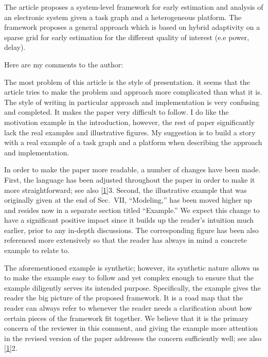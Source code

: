 \begin{reviewer}
The article proposes a system-level framework for early estimation and analysis
of an electronic system given a task graph and a heterogeneous platform. The
framework proposes a general approach which is based on hybrid adaptivity on a
sparse grid  for early estimation for the different quality of interest (e.e
power, delay).

Here are my comments to the author:

The most problem of this article is the style of presentation. it seems that the
article tries to make the problem and approach more complicated than what it is.
The style of writing in particular approach and implementation is very confusing
and completed. It makes the paper very difficult to follow. I do like the
motivation example in the introduction, however, the rest of paper significantly
lack the real examples and illustrative figures. My suggestion is to build a
story with a real example of a task graph and a platform when describing the
approach and implementation.
\end{reviewer}

\begin{authors}
In order to make the paper more readable, a number of changes have been made.
First, the language has been adjusted throughout the paper in order to make it
more straightforward; see also \cref{1}{3}. Second, the illustrative example
that was originally given at the end of Sec.~VII, ``Modeling,'' has been moved
higher up and resides now in a separate section titled ``Example.'' We expect
this change to have a significant positive impact since it builds up the
reader's intuition much earlier, prior to any in-depth discussions. The
corresponding figure has been also referenced more extensively so that the
reader has always in mind a concrete example to relate to.

The aforementioned example is synthetic; however, its synthetic nature allows us
to make the example easy to follow and yet complex enough to ensure that the
example diligently serves its intended purpose. Specifically, the example gives
the reader the big picture of the proposed framework. It is a road map that the
reader can always refer to whenever the reader needs a clarification about how
certain pieces of the framework fit together. We believe that it is the primary
concern of the reviewer in this comment, and giving the example more attention
in the revised version of the paper addresses the concern sufficiently well; see
also \cref{1}{2}.

\begin{actions}
\end{actions}
\end{authors}

